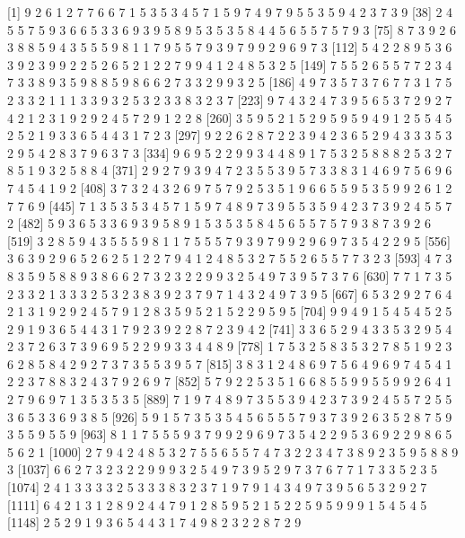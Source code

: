 \documentclass[
]{article}
\begin{document}
{[}1{]} 9 2 6 1 2 7 7 6 6 7 1 5 3 5 3 4 5 7 1 5 9 7 4 9 7 9 5 5 3 5 9 4
2 3 7 3 9 {[}38{]} 2 4 5 5 7 5 9 3 6 6 5 3 3 6 9 3 9 5 8 9 5 3 5 3 5 8 4
4 5 6 5 5 7 5 7 9 3 {[}75{]} 8 7 3 9 2 6 3 8 8 5 9 4 3 5 5 5 9 8 1 1 7 9
5 5 7 9 3 9 7 9 9 2 9 6 9 7 3 {[}112{]} 5 4 2 2 8 9 5 3 6 3 9 2 3 9 9 2
2 5 2 6 5 2 1 2 2 7 9 9 4 1 2 4 8 5 3 2 5 {[}149{]} 7 5 5 2 6 5 5 7 7 2
3 4 7 3 3 8 9 3 5 9 8 8 5 9 8 6 6 2 7 3 3 2 9 9 3 2 5 {[}186{]} 4 9 7 3
5 7 3 7 6 7 7 3 1 7 5 2 3 3 2 1 1 1 3 3 9 3 2 5 3 2 3 3 8 3 2 3 7
{[}223{]} 9 7 4 3 2 4 7 3 9 5 6 5 3 7 2 9 2 7 4 2 1 2 3 1 9 2 9 2 4 5 7
2 9 1 2 2 8 {[}260{]} 3 5 9 5 2 1 5 2 9 5 9 5 9 4 9 1 2 5 5 4 5 2 5 2 1
9 3 3 6 5 4 4 3 1 7 2 3 {[}297{]} 9 2 2 6 2 8 7 2 2 3 9 4 2 3 6 5 2 9 4
3 3 3 5 3 2 9 5 4 2 8 3 7 9 6 3 7 3 {[}334{]} 9 6 9 5 2 2 9 9 3 4 4 8 9
1 7 5 3 2 5 8 8 8 2 5 3 2 7 8 5 1 9 3 2 5 8 8 4 {[}371{]} 2 9 2 7 9 3 9
4 7 2 3 5 5 3 9 5 7 3 3 8 3 1 4 6 9 7 5 6 9 6 7 4 5 4 1 9 2 {[}408{]} 3
7 3 2 4 3 2 6 9 7 5 7 9 2 5 3 5 1 9 6 6 5 5 9 5 3 5 9 9 2 6 1 2 7 7 6 9
{[}445{]} 7 1 3 5 3 5 3 4 5 7 1 5 9 7 4 8 9 7 3 9 5 5 3 5 9 4 2 3 7 3 9
2 4 5 5 7 2 {[}482{]} 5 9 3 6 5 3 3 6 9 3 9 5 8 9 1 5 3 5 3 5 8 4 5 6 5
5 7 5 7 9 3 8 7 3 9 2 6 {[}519{]} 3 2 8 5 9 4 3 5 5 5 9 8 1 1 7 5 5 5 7
9 3 9 7 9 9 2 9 6 9 7 3 5 4 2 2 9 5 {[}556{]} 3 6 3 9 2 9 6 5 2 6 2 5 1
2 2 7 9 4 1 2 4 8 5 3 2 7 5 5 2 6 5 5 7 7 3 2 3 {[}593{]} 4 7 3 8 3 5 9
5 8 8 9 3 8 6 6 2 7 3 2 3 2 2 9 9 3 2 5 4 9 7 3 9 5 7 3 7 6 {[}630{]} 7
7 1 7 3 5 2 3 3 2 1 3 3 3 2 5 3 2 3 8 3 9 2 3 7 9 7 1 4 3 2 4 9 7 3 9 5
{[}667{]} 6 5 3 2 9 2 7 6 4 2 1 3 1 9 2 9 2 4 5 7 9 1 2 8 3 5 9 5 2 1 5
2 2 9 5 9 5 {[}704{]} 9 9 4 9 1 5 4 5 4 5 2 5 2 9 1 9 3 6 5 4 4 3 1 7 9
2 3 9 2 2 8 7 2 3 9 4 2 {[}741{]} 3 3 6 5 2 9 4 3 3 5 3 2 9 5 4 2 3 7 2
6 3 7 3 9 6 9 5 2 2 9 9 3 3 4 4 8 9 {[}778{]} 1 7 5 3 2 5 8 3 5 3 2 7 8
5 1 9 2 3 6 2 8 5 8 4 2 9 2 7 3 7 3 5 5 3 9 5 7 {[}815{]} 3 8 3 1 2 4 8
6 9 7 5 6 4 9 6 9 7 4 5 4 1 2 2 3 7 8 8 3 2 4 3 7 9 2 6 9 7 {[}852{]} 5
7 9 2 2 5 3 5 1 6 6 8 5 5 9 9 5 5 9 9 2 6 4 1 2 7 9 6 9 7 1 3 5 3 5 3 5
{[}889{]} 7 1 9 7 4 8 9 7 3 5 5 3 9 4 2 3 7 3 9 2 4 5 5 7 2 5 5 3 6 5 3
3 6 9 3 8 5 {[}926{]} 5 9 1 5 7 3 5 3 5 4 5 6 5 5 5 7 9 3 7 3 9 2 6 3 5
2 8 7 5 9 3 5 5 9 5 5 9 {[}963{]} 8 1 1 7 5 5 5 9 3 7 9 9 2 9 6 9 7 3 5
4 2 2 9 5 3 6 9 2 2 9 8 6 5 5 6 2 1 {[}1000{]} 2 7 9 4 2 4 8 5 3 2 7 5 5
6 5 5 7 4 7 3 2 2 3 4 7 3 8 9 2 3 5 9 5 8 8 9 3 {[}1037{]} 6 6 2 7 3 2 3
2 2 9 9 9 3 2 5 4 9 7 3 9 5 2 9 7 3 7 6 7 7 1 7 3 3 5 2 3 5 {[}1074{]} 2
4 1 3 3 3 3 2 5 3 3 3 8 3 2 3 7 1 9 7 9 1 4 3 4 9 7 3 9 5 6 5 3 2 9 2 7
{[}1111{]} 6 4 2 1 3 1 2 8 9 2 4 4 7 9 1 2 8 5 9 5 2 1 5 2 2 5 9 5 9 9 9
1 5 4 5 4 5 {[}1148{]} 2 5 2 9 1 9 3 6 5 4 4 3 1 7 4 9 8 2 3 2 2 8 7 2 9
\end{document}
